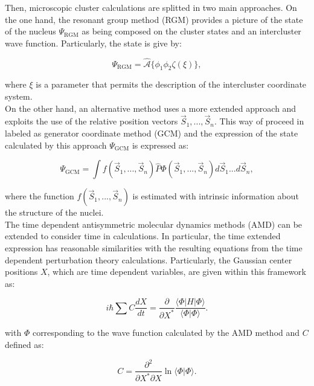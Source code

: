 \documentclass[openany]{book}
\begin{document}
Then, microscopic cluster calculations are splitted in two main approaches. On the one hand,  the resonant group method (RGM) provides a picture of the state of the nucleus $	\Psi_{\mathrm{RGM}}$ as being composed on the cluster states and an intercluster wave function. Particularly, the state is give by:

\begin{equation}\label{eq:micro_cluster_RGM_waveFunction}
	\Psi_{\mathrm{RGM}} =  \hat {\mathcal{A}} \{\phi_1 \phi_2 \zeta (\xi) \},
\end{equation}

where $\xi$ is a parameter that permits the description of the intercluster coordinate system. \\

On the other hand, an alternative method uses a more extended approach and exploits the use of the relative position vectors $\vec S_1, ..., \vec S_n$. This way of proceed in labeled as generator coordinate method  (GCM) and the expression of the state calculated by this approach $	\Psi_{\mathrm{GCM}}$ is expressed as: 

\begin{equation}\label{eq:micro_cluster_GCM_waveFunction}
	\Psi_{\mathrm{GCM}} = \int f(\vec S_1, ..., \vec S_n) \hat P \Phi(\vec S_1, ..., \vec S_n) d\vec S_1 ... d\vec S_n,
\end{equation}

where the function $ f(\vec S_1, ..., \vec S_n) $ is estimated with intrinsic information about the structure of the nuclei. \\

The time dependent antisymmetric molecular dynamics methods (AMD) can be extended to consider time in calculations. In particular, the time extended expression has reasonable similarities with the resulting equations from the time dependent perturbation theory calculations. Particularly, the Gaussian center positions $X$, which are time dependent variables, are given within this framework as:

\begin{equation}\label{eq:micro_AMD_timeDependent}
	i \hbar \sum C \frac{dX}{dt} = \frac{\partial}{\partial X^{*}} \frac{\langle \Phi | H | \Phi \rangle }{\langle \Phi | \Phi \rangle}.
\end{equation}

with $\Phi$ corresponding to the wave function calculated by the AMD method and $C$ defined as: 

\begin{equation}\label{eq:micro_AMD_timeDependent_constants}
	C = \frac{\partial^2}{\partial X^{*} \partial X} \ln {\langle \Phi | \Phi \rangle }.
\end{equation}
\end{document}
